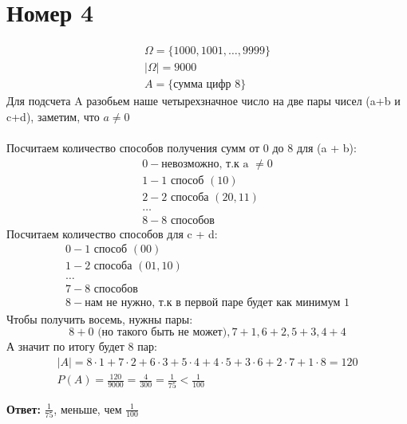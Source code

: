 \documentclass[a4paper,12pt]{article}
\begin{document}
\section*{Номер 4}
\begin{equation*}
\begin{gathered}
\Omega = \{
1000, 1001, \ldots, 9999
\} \\
|\Omega| = 9000 \\
A = \{\text{сумма цифр 8}
\}
\end{gathered}
\end{equation*}
Для подсчета A разобьем наше четырехзначное число на две пары чисел (a+b и c+d), заметим, что $a \neq 0$
\\\\
Посчитаем количество способов получения сумм от 0 до 8 для (a + b):
\begin{equation*}
\begin{gathered}
0 - \text{невозможно, т.к a $\neq 0$}
\\
1 - 1 \text{ способ } (10)\\
2 - 2 \text{ способа } (20, 11)\\
\ldots \\
8 - 8 \text{ способов}
\end{gathered}
\end{equation*}
Посчитаем количество способов для c + d:
\begin{equation*}
\begin{gathered}
0 - 1 \text{ способ } (00)\\
1 - 2 \text{ способа } (01, 10) \\
\ldots \\
7 - 8 \text{ способов } \\
8 - \text{нам не нужно, т.к в первой паре будет как минимум 1}
\end{gathered}
\end{equation*}
Чтобы получить восемь, нужны пары:
\[
8 + 0 \text{ (но такого быть не может)}, 7 + 1, 6 + 2, 5 + 3, 4 + 4
\]
А значит по итогу будет 8 пар:
\begin{equation*}
\begin{gathered}
|A| = 8 \cdot 1 + 7 \cdot 2 + 6 \cdot 3 + 5 \cdot 4 + 4 \cdot 5 + 3 \cdot 6 + 2 \cdot 7 + 1 \cdot 8 = 120\\
P(A) = \frac{120}{9000} = \frac{4}{300} = \frac{1}{75} < \frac{1}{100}
\end{gathered}
\end{equation*}
\begin{center}
\textbf{Ответ: } $\frac{1}{75}$, меньше, чем $\frac{1}{100}$
\end{center}
\newpage
\end{document}
